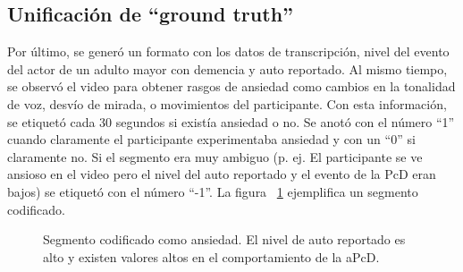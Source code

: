 	\subsection{Unificaci\'on de ``ground truth''}\label{secc:unificacion}
	Por \'ultimo, se gener\'o un formato con los datos de transcripci\'on, nivel del evento del actor de un adulto mayor con demencia y auto reportado. Al mismo tiempo, se observ\'o el video para obtener rasgos de ansiedad como cambios en la tonalidad de voz, desv\'io de mirada, o movimientos del participante. Con esta informaci\'on, se etiquet\'o cada 30 segundos si exist\'ia ansiedad o no. Se anot\'o con el n\'umero ``1'' cuando claramente el participante experimentaba ansiedad y con un ``0'' si claramente no. Si el segmento era muy ambiguo (p. ej. El participante se ve ansioso en el video pero el nivel del auto reportado y el evento de la PcD eran bajos) se etiquet\'o con el n\'umero ``-1''. La figura ~\ref{fig:imggtlabel} ejemplifica un segmento codificado.
	\begin{figure}[h!]
		\centering
		\caption{Segmento codificado como ansiedad. El nivel de auto reportado es alto y existen valores altos en el comportamiento de la aPcD. }\label{fig:imggtlabel}
	\end{figure}
